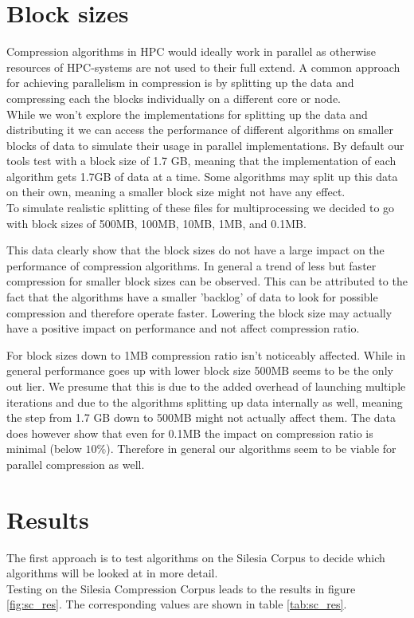 \documentclass[
	12pt,
	a4paper,
	BCOR10mm,
	DIV14,
	listof=totoc,
	bibliography=totoc,
	headsepline
]{scrreprt}
\begin{document}
\newpage
\section*{Block sizes}
Compression algorithms in HPC would ideally work in parallel as otherwise resources of HPC-systems are not used to their full extend.
A common approach for achieving parallelism in compression is by splitting up the data and compressing each the blocks individually on a different core or node\cite{BenComp}. \\
While we won't explore the implementations for splitting up the data and distributing it we can access the performance of different algorithms on smaller blocks of data to simulate their usage in parallel implementations. 
By default our tools test with a block size of 1.7 GB, meaning that the implementation of each algorithm gets 1.7GB of data at a time. 
Some algorithms may split up this data on their own, meaning a smaller block size might not have any effect. \\%
To simulate realistic splitting of these files for multiprocessing we decided to go with block sizes of 500MB, 100MB, 10MB, 1MB, and 0.1MB.


This data clearly show that the block sizes do not have a large impact on the performance of compression algorithms. 
In general a trend of less but faster compression for smaller block sizes can be observed.
This can be attributed to the fact that the algorithms have a smaller 'backlog' of data to look for possible compression and therefore operate faster\cite{ResComp}. 
Lowering the block size may actually have a positive impact on performance and not affect compression ratio.

For block sizes down to 1MB compression ratio isn't noticeably affected.
While in general performance goes up with lower block size 500MB seems to be the only out lier.
We presume that this is due to the added overhead of launching multiple iterations and due to the algorithms splitting up data internally as well, meaning the step from 1.7 GB down to 500MB might not actually affect them.
The data does however show that even for 0.1MB the impact on compression ratio is minimal (below $10\%$). 
Therefore in general our algorithms seem to be viable for parallel compression as well.

\FloatBarrier
\section{Results}
\label{Results}
The first approach is to test algorithms on the Silesia Corpus to decide which algorithms will be looked at in more detail.
\\
Testing on the Silesia Compression Corpus leads to the results in figure \ref{fig:sc_res}. 
The corresponding values are shown in table \ref{tab:sc_res}. \\
\end{document}
